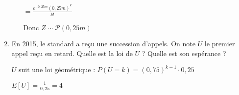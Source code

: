 \begin{enumerate}
\begin{itemize}
        \(= \frac{e^{-0,25 m} (0,25 m)^k}{k!}\)
        
        Donc \(Z \sim \mathcal{P}(0,25 m)\)
    \end{itemize}
    
    \item En 2015, le standard a reçu une succession d'appels. On note \(U\) le premier appel reçu en retard. Quelle est la loi de \(U\) ? Quelle est son espérance ?
    
    \(U\) suit une loi géométrique : \(P(U=k) = (0,75)^{k-1} \cdot 0,25\)
    
    \(E[U] = \frac{1}{0,25} = 4\)
\end{enumerate}

